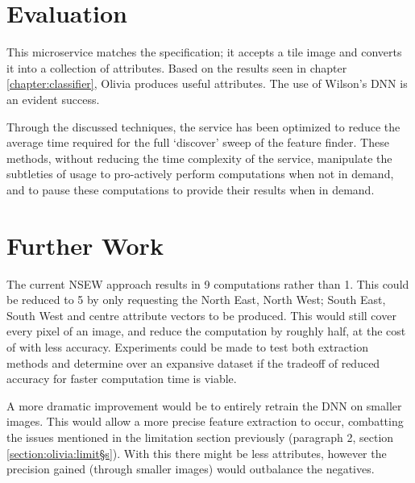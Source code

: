 \section{Evaluation}
This microservice matches the specification; it accepts a tile image and converts it into a collection of attributes. Based on the results seen in chapter \ref{chapter:classifier}, Olivia produces useful attributes. The use of Wilson’s DNN is an evident success. 

Through the discussed techniques, the service has been optimized to reduce the average time required for the full ‘discover’ sweep of the feature finder. These methods, without reducing the time complexity of the service, manipulate the subtleties of usage to pro-actively perform computations when not in demand, and to pause these computations to provide their results when in demand. 

\section{Further Work}
The current NSEW approach results in 9 computations rather than 1. This could be reduced to 5 by only requesting the North East, North West; South East, South West and centre attribute vectors to be produced. This would still cover every pixel of an image, and reduce the computation by roughly half, at the cost of with less accuracy. Experiments could be made to test both extraction methods and determine over an expansive dataset if the tradeoff of reduced accuracy for faster computation time is viable.

A more dramatic improvement would be to entirely retrain the DNN on smaller images. This would allow a more precise feature extraction to occur, combatting the issues mentioned in the limitation section previously (paragraph 2, section \ref{section:olivia:limit§s}). With this there might be less attributes, however the precision gained (through smaller images) would outbalance the negatives.